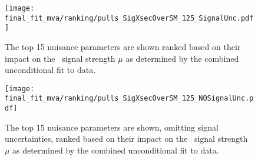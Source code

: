\begin{figure}[ht]
  \centering
  \texttt{[image: final\_fit\_mva/ranking/pulls\_SigXsecOverSM\_125\_SignalUnc.pdf]}
  \caption{The top 15 nuisance parameters are shown ranked based on their impact
    on the \VHbb\ signal strength $\mu$ as determined by the combined
    unconditional fit to data.}
  \label{fig:Rank_012L_MVAVH}
\end{figure}
\begin{figure}[hb]
  \centering
  \texttt{[image: final\_fit\_mva/ranking/pulls\_SigXsecOverSM\_125\_NOSignalUnc.pdf]}
  \caption{The top 15 nuisance parameters are shown, omitting signal
    uncertainties, ranked based on their impact on the \VHbb\ signal strength
    $\mu$ as determined by the combined unconditional fit to data.}
  \label{fig:Rank_012L_MVAVH_nosig}
\end{figure}
